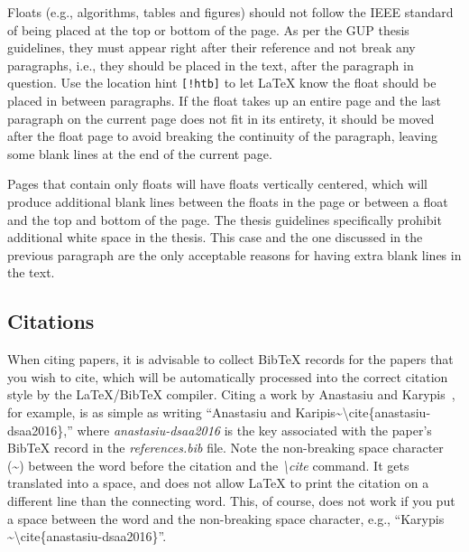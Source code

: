 Floats (e.g., algorithms, tables and figures) should not follow the IEEE standard of being placed at the top or bottom of the page. As per the GUP thesis guidelines, they must appear right after their reference and not break any paragraphs, i.e., they should be placed in the text, after the paragraph in question. Use the location hint \texttt{[!htb]} to let LaTeX know the float should be placed in between paragraphs. If the float takes up an entire page and the last paragraph on the current page does not fit in its entirety, it should be moved after the float page to avoid breaking the continuity of the paragraph, leaving some blank lines at the end of the current page.

Pages that contain only floats will have floats vertically centered, which will produce additional blank lines between the floats in the page or between a float and the top and bottom of the page. The thesis guidelines specifically prohibit additional white space in the thesis. This case and the one discussed in the previous paragraph are the only acceptable reasons for having extra blank lines in the text.

\subsection{Citations}\label{sec:latex:citations}
When citing papers, it is advisable to collect BibTeX records for the papers that you wish to cite, which will be automatically processed into the correct citation style by the LaTeX/BibTeX compiler. Citing a work by Anastasiu and Karypis~\cite{anastasiu-dsaa2016}, for example, is as simple as writing ``Anastasiu and Karipis\textasciitilde{\textbackslash}cite\{anastasiu-dsaa2016\},'' where \textit{anastasiu-dsaa2016} is the key associated with the paper's BibTeX record in the \textit{references.bib} file. Note the non-breaking space character (\textasciitilde) between the word before the citation and the \textit{{\textbackslash}cite} command. It gets translated into a space, and does not allow LaTeX to print the citation on a different line than the connecting word. This, of course, does not work if you put a space between the word and the non-breaking space character, e.g., ``Karypis \textasciitilde{\textbackslash}cite\{anastasiu-dsaa2016\}''.

